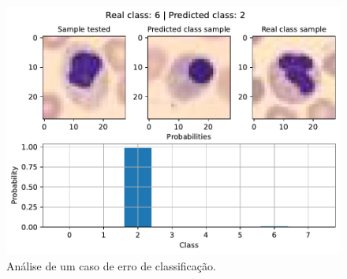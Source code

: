 \begin{figure}[H]
\centering
\includegraphics[width=0.75\linewidth]{../../plot/mlp/error_analyser_62}
\caption{Análise de um caso de erro de classificação.}
\label{fig:error_analyser_62}
\end{figure}

